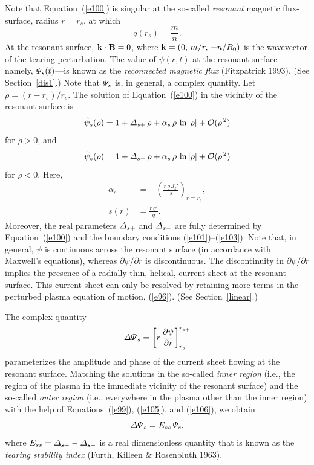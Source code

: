 \documentclass[notitlepage,12pt]{article}
\begin{document}
Note that Equation~(\ref{e100}) is singular at the so-called {\em resonant}\/ magnetic flux-surface, radius $r=r_s$, at which 
\begin{equation}\label{e104}
q(r_s)= \frac{m}{n}.
\end{equation}
At the resonant surface, ${\bf k}\cdot{\bf B}=0$, where ${\bf k} = (0,\,m/r,\,-n/R_0)$ is the wavevector of the tearing perturbation. 
The value of $\psi(r,t)$ at the resonant surface---namely, ${\mit\Psi}_s(t)$---is known as the {\em reconnected magnetic flux}\/ (Fitzpatrick 1993). (See Section~\ref{dis1}.)
Note that ${\mit\Psi}_s$ is, in general, a complex quantity. 
Let $\rho=(r-r_s)/r_s$. 
The solution of Equation~(\ref{e100}) in the vicinity of the resonant surface is
\begin{equation}\label{e105}
\hat{\psi}_s(\rho) = 1 + {\mit\Delta}_{s+}\,\rho + \alpha_s\,\rho\,\ln|\rho| + {\cal O}(\rho^{\,2})
\end{equation}
for $\rho>0$, and
\begin{equation}\label{e106}
\hat{\psi}_s(\rho) = 1 + {\mit\Delta}_{s-}\,\rho + \alpha_s\,\rho\,\ln|\rho| + {\cal O}(\rho^{\,2})
\end{equation}
for $\rho<0$. Here, 
\begin{align}
\alpha_s& =- \left(\frac{r\,q\,J_z'}{s}\right)_{r=r_s},\\[0.5ex]
s(r) &= \frac{r\,q'}{q}.\label{shear}
\end{align}
Moreover,  the real parameters ${\mit\Delta}_{s+}$ and  ${\mit\Delta}_{s-}$ are fully determined by Equation~(\ref{e100})
and the boundary conditions (\ref{e101})--(\ref{e103}). Note that, in general, $\psi$ is continuous across the resonant surface (in accordance with Maxwell's equations),
whereas $\partial\psi/\partial r$ is discontinuous. The discontinuity in $\partial \psi/\partial r$ implies the presence of a radially-thin, helical,  current sheet  at the resonant surface. This current sheet can only be resolved by retaining more terms in the perturbed plasma equation of motion, (\ref{e96}). (See Section~\ref{linear}.) 

The complex quantity
\begin{equation}\label{e109}
{\mit\Delta\Psi}_s = \left[r\,\frac{\partial \psi}{\partial r}\right]_{r_{s-}}^{r_{s+}}
\end{equation}
parameterizes the amplitude and phase of the current sheet flowing at the resonant surface. Matching the solutions
in the so-called {\em inner region}\/ (i.e., the region of the plasma in the immediate vicinity of the resonant surface)
and the so-called {\em outer region}\/ (i.e., everywhere in the plasma other than the inner region) with the help
of Equations~(\ref{e99}), (\ref{e105}), and (\ref{e106}), we obtain
\begin{equation}\label{e110}
{\mit\Delta\Psi}_s = E_{ss}\,{\mit\Psi}_s,
\end{equation}
where $E_{ss}= {\mit\Delta}_{s+}-{\mit\Delta}_{s-}$ is a real dimensionless quantity that is known as the {\em tearing stability index}\/ (Furth, Killeen \& Rosenbluth 1963). 
\end{document}
